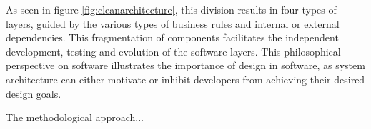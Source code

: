 \documentclass[../report.tex]{subfiles}
\begin{document}
As seen in figure \ref{fig:cleanarchitecture}, this division results in four types of layers, guided by the various types of business rules and internal or external dependencies. This fragmentation of components facilitates the independent development, testing and evolution of the software layers. This philosophical perspective on software illustrates the importance of design in software, as system architecture can either motivate or inhibit developers from achieving their desired design goals.


\pagebreak

The methodological approach...

\end{document}
